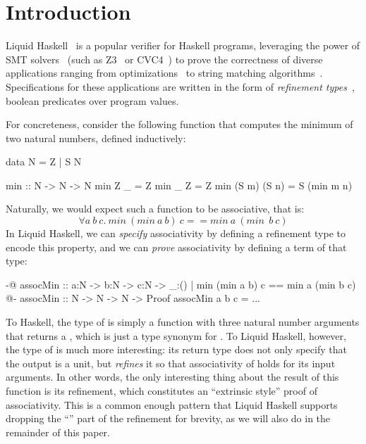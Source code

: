 \section{Introduction}

Liquid Haskell~\cite{liquidHaskell} is a popular verifier for Haskell
programs, leveraging the power of SMT solvers~\cite{BarST-RR-10} (such
as Z3~\cite{Z3} or CVC4~\cite{CVC4}) to prove the correctness of
diverse applications ranging from optimizations~\cite{TPE2018} to
string matching algorithms~\cite{TaleOfTwoProvers}. Specifications for
these applications are written in the form of {\em refinement
  types}~\cite{RefinementForML}, boolean predicates over program
values.

For concreteness, consider the following  function that
computes the minimum of two natural numbers, defined inductively:
\begin{code}
  data N = Z | S N
  
  min :: N -> N -> N 
  min Z _ = Z
  min _ Z = Z
  min (S m) (S n) = S (min m n)
\end{code}

\newcommand{\imin}{\textit{min}~}
Naturally, we would expect such a function to be associative, that is:
$$ \forall a ~ b ~ c. ~ \imin (\imin a~b)~c == \imin a~(\imin~b~c) $$
%
In Liquid Haskell, we can {\em specify} associativity by defining a
refinement type to encode this property, and we can {\em prove}
associativity by defining a term of that type:
%
\begin{code}
  {-@ assocMin :: a:N -> b:N -> c:N ->
      {_:() | min (min a b) c == min a (min b c)}
  @-}
  assocMin :: N -> N -> N -> Proof
  assocMin a b c = ...
\end{code}
%
To Haskell, the type of  is simply a function with three
natural number arguments that returns a , which is just a
type synonym for \LC{()}. To Liquid Haskell, however, the type of
 is much more interesting: its return type does not only
specify that the output is a unit, but {\em refines} it so that
associativity of  holds for its input arguments. In other
words, the only interesting thing about the result of this function is
its refinement, which constitutes an ``extrinsic style'' proof of
associativity. This is a common enough pattern that Liquid Haskell
supports dropping the ``\LC{_:()}'' part of the refinement for
brevity, as we will also do in the remainder of this paper.


